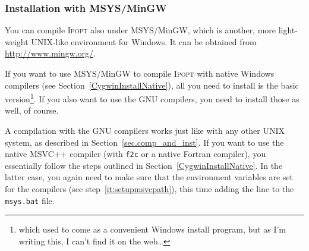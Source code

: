 \documentclass[10pt]{article}
\newcommand{\Ipopt}{\textsc{Ipopt}\xspace}
\begin{document}
\subsubsection{Installation with MSYS/MinGW}\label{MinGWInstall}

You can compile \Ipopt also under MSYS/MinGW, which is another, more
light-weight UNIX-like environment for Windows.  It can be obtained
from \url{http://www.mingw.org/}.

If you want to use MSYS/MinGW to compile \Ipopt with native Windows
compilers (see Section~\ref{CygwinInstallNative}), all you need to
install is the basic version\footnote{which used to come as a
  convenient Windows install program, but as I'm writing this, I can't
  find it on the web\ldots}.  If you also want to use the GNU
compilers, you need to install those as well, of course.

A compilation with the GNU compilers works just like with any other
UNIX system, as described in Section~\ref{sec.comp_and_inst}.  If you
want to use the native MSVC++ compiler (with {\tt f2c} or a native
Fortran compiler), you essentially follow the steps outlined in
Section~\ref{CygwinInstallNative}.  In the latter case, you again need
to make sure that the environment variables are set for the compilers
(see step~\ref{it:setupmsvcpath}), this time adding the line to the
{\tt msys.bat} file.  %




\end{document}
